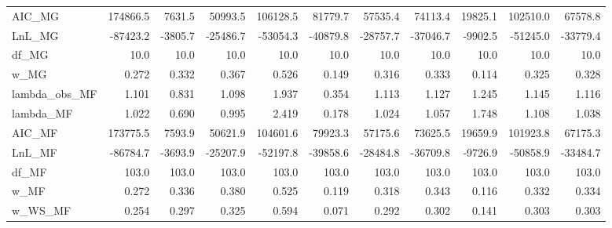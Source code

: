 \begin{tabular}{lrrrrrrrrrr}
AIC\_MG            &      174866.5 &       7631.5 &      50993.5 &               106128.5 &                81779.7 &          57535.4 &       74113.4 &      19825.1 &      102510.0 &      67578.8 \\
LnL\_MG            &      -87423.2 &      -3805.7 &     -25486.7 &               -53054.3 &               -40879.8 &         -28757.7 &      -37046.7 &      -9902.5 &      -51245.0 &     -33779.4 \\
df\_MG             &          10.0 &         10.0 &         10.0 &                   10.0 &                   10.0 &             10.0 &          10.0 &         10.0 &          10.0 &         10.0 \\
w\_MG              &         0.272 &        0.332 &        0.367 &                  0.526 &                  0.149 &            0.316 &         0.333 &        0.114 &         0.325 &        0.328 \\
lambda\_obs\_MF     &         1.101 &        0.831 &        1.098 &                  1.937 &                  0.354 &            1.113 &         1.127 &        1.245 &         1.145 &        1.116 \\
lambda\_MF         &         1.022 &        0.690 &        0.995 &                  2.419 &                  0.178 &            1.024 &         1.057 &        1.748 &         1.108 &        1.038 \\
AIC\_MF            &      173775.5 &       7593.9 &      50621.9 &               104601.6 &                79923.3 &          57175.6 &       73625.5 &      19659.9 &      101923.8 &      67175.3 \\
LnL\_MF            &      -86784.7 &      -3693.9 &     -25207.9 &               -52197.8 &               -39858.6 &         -28484.8 &      -36709.8 &      -9726.9 &      -50858.9 &     -33484.7 \\
df\_MF             &         103.0 &        103.0 &        103.0 &                  103.0 &                  103.0 &            103.0 &         103.0 &        103.0 &         103.0 &        103.0 \\
w\_MF              &         0.272 &        0.336 &        0.380 &                  0.525 &                  0.119 &            0.318 &         0.343 &        0.116 &         0.332 &        0.334 \\
w\_WS\_MF           &         0.254 &        0.297 &        0.325 &                  0.594 &                  0.071 &            0.292 &         0.302 &        0.141 &         0.303 &        0.303 \\

\end{tabular}
